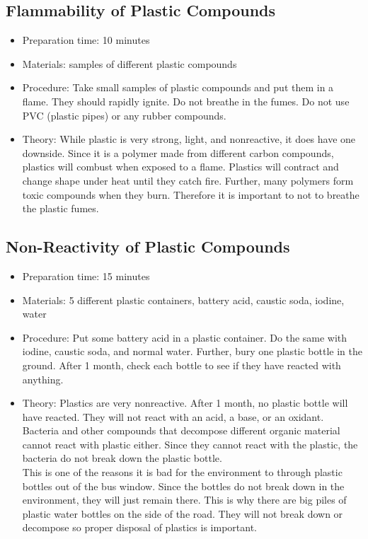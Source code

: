 \subsection{Flammability of Plastic Compounds}
\begin{itemize}
\item{Preparation time: 10 minutes}
\item{Materials: samples of different plastic compounds}
\item{Procedure: Take small samples of plastic compounds and put them in a flame. They should rapidly ignite. Do not breathe in the fumes. Do not use PVC (plastic pipes) or any rubber compounds.}
\item{Theory: While plastic is very strong, light, and nonreactive, it does have one downside. Since it is a polymer made from different carbon compounds, plastics will combust when exposed to a flame. Plastics will contract and change shape under heat until they catch fire. Further, many polymers form toxic compounds when they burn. Therefore it is important to not to breathe the plastic fumes.}
\end{itemize}

\subsection{Non-Reactivity of Plastic Compounds}
\begin{itemize}
\item{Preparation time: 15 minutes}
\item{Materials: 5 different plastic containers, battery acid, caustic soda, iodine, water}
\item{Procedure: Put some battery acid in a plastic container. Do the same with iodine, caustic soda, and normal water. Further, bury one plastic bottle in the ground. After 1 month, check each bottle to see if they have reacted with anything.}
\item{Theory: Plastics are very nonreactive. After 1 month, no plastic bottle will have reacted. They will not react with an acid, a base, or an oxidant. Bacteria and other compounds that decompose different organic material cannot react with plastic either. Since they cannot react with the plastic, the bacteria do not break down the plastic bottle.\\
This is one of the reasons it is bad for the environment to through plastic bottles out of the bus window. Since the bottles do not break down in the environment, they will just remain there. This is why there are big piles of plastic water bottles on the side of the road. They will not break down or decompose so proper disposal of plastics is important.}
\end{itemize}

